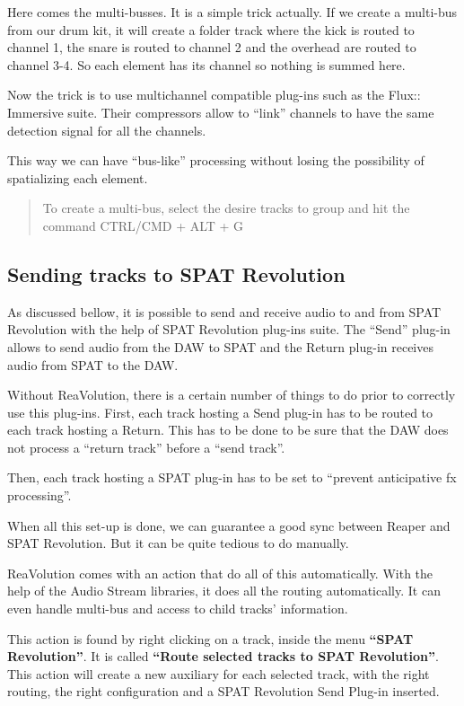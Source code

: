 \documentclass[
  letterpaper,
  DIV=11,
  numbers=noendperiod]{scrreport}
\begin{document}
Here comes the multi-busses. It is a simple trick actually. If we create
a multi-bus from our drum kit, it will create a folder track where the
kick is routed to channel 1, the snare is routed to channel 2 and the
overhead are routed to channel 3-4. So each element has its channel so
nothing is summed here.

Now the trick is to use multichannel compatible plug-ins such as the
Flux:: Immersive suite. Their compressors allow to ``link'' channels to
have the same detection signal for all the channels.

This way we can have ``bus-like'' processing without losing the
possibility of spatializing each element.

\begin{quote}
To create a multi-bus, select the desire tracks to group and hit the
command CTRL/CMD + ALT + G
\end{quote}

\hypertarget{sending-tracks-to-spat-revolution}{%
\subsection{Sending tracks to SPAT
Revolution}\label{sending-tracks-to-spat-revolution}}

As discussed bellow, it is possible to send and receive audio to and
from SPAT Revolution with the help of SPAT Revolution plug-ins suite.
The ``Send'' plug-in allows to send audio from the DAW to SPAT and the
Return plug-in receives audio from SPAT to the DAW.

Without ReaVolution, there is a certain number of things to do prior to
correctly use this plug-ins. First, each track hosting a Send plug-in
has to be routed to each track hosting a Return. This has to be done to
be sure that the DAW does not process a ``return track'' before a ``send
track''.

Then, each track hosting a SPAT plug-in has to be set to ``prevent
anticipative fx processing''.

When all this set-up is done, we can guarantee a good sync between
Reaper and SPAT Revolution. But it can be quite tedious to do manually.

ReaVolution comes with an action that do all of this automatically. With
the help of the Audio Stream libraries, it does all the routing
automatically. It can even handle multi-bus and access to child tracks'
information.

This action is found by right clicking on a track, inside the menu
\textbf{``SPAT Revolution''}. It is called \textbf{``Route selected
tracks to SPAT Revolution''}. This action will create a new auxiliary
for each selected track, with the right routing, the right configuration
and a SPAT Revolution Send Plug-in inserted.
\end{document}
